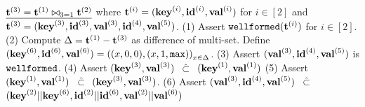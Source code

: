 \begin{small}
\begin{algorithm}[bt]
$\underline{{{\mathbf {t}}}^{(3)} = {{\mathbf {t}}}^{(1)} \bowtie_{3=1} {{\mathbf {t}}}^{(2)}}$ where ${{\mathbf {t}}}^{(i)}= ({{\mathbf {key}}}^{(i)}, {{\mathbf {id}}}^{(i)}, {{\mathbf {val}}}^{(i)})$ for
	$i\in[2]$ and ${{\mathbf {t}}}^{(3)} = ({{\mathbf {key}}}^{(3)}, {{\mathbf {id}}}^{(3)},
		{{\mathbf {val}}}^{(3)}, {{\mathbf {id}}}^{(4)}, {{\mathbf {val}}}^{(5)})$.
	\newline
	(1) Assert ${\tt wellformed}({{\mathbf {t}}}^{(i)})$ for $i\in [2]$. \newline
	(2) Compute $\Delta = {{\mathbf {t}}}^{(1)} - {{\mathbf {t}}}^{(3)}$ as 
		difference of multi-set. Define
		$({{\mathbf {key}}}^{(6)}, {{\mathbf {id}}}^{(6)}, {{\mathbf {val}}}^{(6)})
			= \left( (x,0,0), (x,1,\texttt{max}) \right)_{x\in \Delta}$. \newline
	(3) Assert $( {{\mathbf {val}}}^{(3)}, {{\mathbf {id}}}^{(4)}, 
		{{\mathbf {val}}}^{(5)})$
		is ${\tt wellformed}$. \newline
	(4) Assert $({{\mathbf {key}}}^{(3)}, {{\mathbf {val}}}^{(3)})$ 
		$~\hat{\subset}~$
		$({{\mathbf {key}}}^{(1)}, {{\mathbf {val}}}^{(1)})$ \newline
	(5) Assert
		$({{\mathbf {key}}}^{(1)}, {{\mathbf {val}}}^{(1)})$
		$~\hat{\subset}~$
		$({{\mathbf {key}}}^{(3)}, {{\mathbf {val}}}^{(3)})$. \newline
	(6) Assert 
		$({{\mathbf {val}}}^{(3)}, {{\mathbf {id}}}^{(4)}, {{\mathbf {val}}}^{(5)})$ 
		$~\hat{\subset}~$
		$({{\mathbf {key}}}^{(2)} || {{\mathbf {key}}}^{(6)}, 
			{{\mathbf {id}}}^{(2)} || {{\mathbf {id}}}^{(6)}, 
			{{\mathbf {val}}}^{(2)} || {{\mathbf {val}}}^{(6)})$ \newline

\caption{Relational Operators Based on Lookup Argument}
\label{fig:db}
\end{algorithm}
\end{small}


